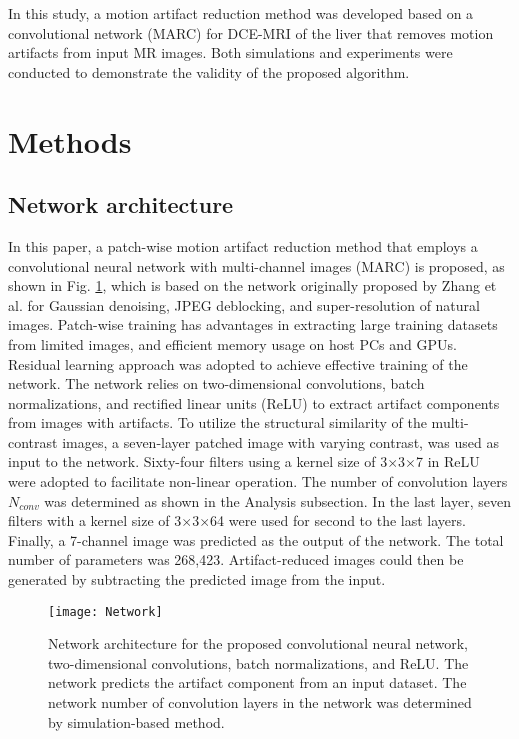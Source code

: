 \documentclass[num-refs]{wiley-article}
\begin{document}
In this study, a motion artifact reduction method was developed based on a convolutional network (MARC) for DCE-MRI of the liver that removes motion artifacts from input MR images. Both simulations and experiments were conducted to demonstrate the validity of the proposed algorithm.



\section{Methods}



\subsection{Network architecture}

In this paper, a patch-wise motion artifact reduction method that employs a convolutional neural network with multi-channel images (MARC) is proposed, as shown in Fig. \ref{fig_network}, which is based on the network originally proposed by Zhang et al. for Gaussian denoising, JPEG deblocking, and super-resolution of natural images\cite{zhang2017beyond}. Patch-wise training has advantages in extracting large training datasets from limited images, and efficient memory usage on host PCs and GPUs. Residual learning approach was adopted to achieve effective training of the network\cite{he2016deep}. The network relies on two-dimensional convolutions, batch normalizations, and rectified linear units (ReLU) to extract artifact components from images with artifacts. To utilize the structural similarity of the multi-contrast images, a seven-layer patched image with varying contrast, was used as input to the network. Sixty-four filters using a kernel size of 3$\times$3$\times$7 in ReLU were adopted to facilitate non-linear operation. The number of convolution layers $N_{conv}$ was determined as shown in the Analysis subsection. In the last layer, seven filters with a kernel size of 3$\times$3$\times$64 were used for second to the last layers. Finally, a 7-channel image was predicted as the output of the network. The total number of parameters was 268,423. Artifact-reduced images could then be generated by subtracting the predicted image from the input.


\begin{figure}[bt]
\centering
\texttt{[image: Network]}
\caption{Network architecture for the proposed convolutional neural network, two-dimensional convolutions, batch normalizations, and ReLU. The network predicts the artifact component from an input dataset. The network number of convolution layers in the network was determined by simulation-based method.}
\label{fig_network}
\end{figure}
\end{document}
